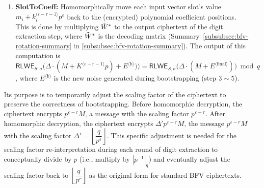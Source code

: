 \begin{tcolorbox}[title={\textbf{\tboxlabel{\ref*{subsubsec:bfv-bootstrapping-summary}} BFV Bootstrapping}}]
\begin{enumerate}
$ $

, provided $E'$'s each coefficient is smaller than $\left\|\dfrac{p^{\varepsilon-r}}{2}\right\|$. At this point, each input vector slot contains the noise-removed coefficient $m_i + k_i^{\langle \varepsilon - r - 1\rangle}p$. 

 At each $i$-th round of digit extraction, we do not explicitly multiply $|p^{-1}|_q$ to perform division by $p$, but instead conceptually borrow this term from the denominator of the plaintext scaling factor $\Delta'$, conceptually updating the scaling factor to $\left\lfloor\dfrac{q}{p^{\varepsilon-i}}\right\rfloor$. This implies that at $i$-th round of digit extraction, the plaintext operations used for ciphertext-to-plaintext homomorphic operations should encode their values by using the scaling factor $\left\lfloor\dfrac{q}{p^{\varepsilon-i}}\right\rfloor$. At the end of digit extraction, the plaintext scaling factor becomes $\Delta' = \Delta = \left\lfloor\dfrac{q}{p^r}\right\rfloor$. 


$ $

\item \textbf{\textsf{\underline{SlotToCoeff}}:} Homomorphically move each input vector slot's value $m_i + k_i^{\langle \varepsilon - r - 1\rangle}p^\varepsilon$ back to the (encrypted) polynomial coefficient positions. This is done by multiplying $\tilde{W}^*$ to the output ciphertext of the digit extraction step, where $\tilde{W}^*$ is the decoding matrix (Summary~\ref*{subsubsec:bfv-rotation-summary} in \autoref{subsubsec:bfv-rotation-summary}). The output of this computation is $\textsf{RLWE}_{S, \sigma}\bm(\Delta\cdot (M + K^{\langle \varepsilon - r - 1\rangle}p) + E^{\langle \text{b} \rangle}) \bm) = \textsf{RLWE}_{S, \sigma}\bm(\Delta\cdot (M + E^{\langle \text{final} \rangle}) \bm) \bmod q$, where $E^{\langle \text{b} \rangle}$ is the new noise generated during bootstrapping (step $3\sim 5$). 




\end{enumerate}



\end{tcolorbox}

 Its purpose is to temporarily adjust the scaling factor of the ciphertext to preserve the correctness of bootstrapping. Before homomorphic decryption, the ciphertext encrypts $p^{\varepsilon-r} M$, a message with the scaling factor $p^{\varepsilon-r}$. After homomorphic decryption, the ciphertext encrypts $\Delta' p^{\varepsilon-r} M$, the message $p^{\varepsilon-r} M$ with the scaling factor $\Delta' = \left\lfloor\dfrac{q}{p^{\varepsilon}}\right\rfloor$. This specific adjustment is needed for the scaling factor re-interpretation during each round of digit extraction to conceptually divide by $p$ (i.e., multiply by $|p^{-1}|_q$) and eventually adjust the scaling factor back to $\left\lfloor\dfrac{q}{p^r}\right\rfloor$ as the original form for standard BFV ciphertexts. 

